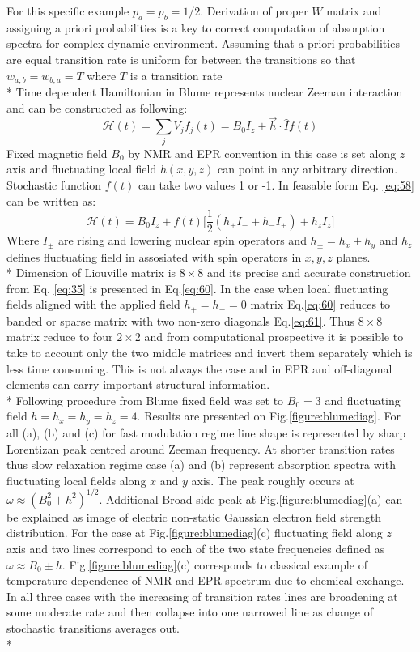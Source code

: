 For this specific example $p_a=p_b=1/2$. Derivation of proper $W$ matrix and assigning a priori probabilities is a key to correct computation of absorption spectra for complex dynamic environment. Assuming that a priori probabilities are equal transition rate is uniform for between the transitions so that $w_{a,b}=w_{b,a}=T$ where $T$ is a transition rate \\*
Time dependent Hamiltonian in Blume\cite{blume} represents nuclear Zeeman interaction and can be constructed as following: 
\begin{equation}\label{eq:58}
\mathcal{H}(t)=\sum_jV_jf_j(t)=B_0I_z+\vec{h}\cdot\hat{I}f(t)
\end{equation}  
Fixed magnetic field $B_0$ by NMR and EPR convention in this case is set along $z$ axis and fluctuating local field $h(x,y,z)$ can point in any arbitrary direction. Stochastic function $f(t)$ can take two values 1 or -1. In feasable form Eq. \ref{eq:58} can be written as: 
\begin{equation}\label{eq:blumeham}
\mathcal{H}(t)=B_0I_z+f(t)\big[\frac{1}{2}(h_+I_-+h_-I_+)+h_zI_z\big]
\end{equation}     
Where $I_{\pm}$ are rising and lowering nuclear spin operators and $h_{\pm}=h_x\pm h_y$ and $h_z$ defines fluctuating field in assosiated with spin operators in $x,y,z$ planes. \\*
Dimension of Liouville matrix is $8\times 8$ and its precise and accurate construction from Eq. \ref{eq:35} is presented in Eq.\ref{eq:60}. In the case when local fluctuating fields aligned with the applied field $h_+=h_-=0$ matrix Eq.\ref{eq:60} reduces to banded or sparse matrix with two non-zero diagonals Eq.\ref{eq:61}. Thus $8\times 8$ matrix reduce to four $2\times 2$ and from computational prospective it is possible to take to account only the two middle matrices and invert them separately which is less time consuming. This is not always the case and in EPR and off-diagonal elements can carry important structural information. \\*
Following procedure from Blume \cite{blume} fixed field was set to $B_0=3$ and fluctuating field $h=h_x=h_y=h_z=4$. Results are presented on Fig.\ref{figure:blumediag}. For all (a), (b) and (c) for fast modulation regime line shape is represented by sharp Lorentizan peak centred around Zeeman frequency. At shorter transition rates thus slow relaxation regime case (a) and (b) represent absorption spectra with fluctuating local fields along $x$ and $y$ axis. The peak roughly occurs at $\omega\approx(B_0^2+h^2)^{1/2}$. Additional Broad side peak at  Fig.\ref{figure:blumediag}(a) can be explained as image of electric non-static Gaussian electron field strength distribution. For the case at Fig.\ref{figure:blumediag}(c) fluctuating field along $z$ axis and two lines correspond to each of the two state frequencies defined as $\omega\approx B_0\pm h$. Fig.\ref{figure:blumediag}(c) corresponds to classical example of temperature dependence of NMR and EPR spectrum due to chemical exchange. In all three cases with the increasing of transition rates lines are broadening at some moderate rate and then collapse into one narrowed line as change of stochastic transitions averages out. \\*
